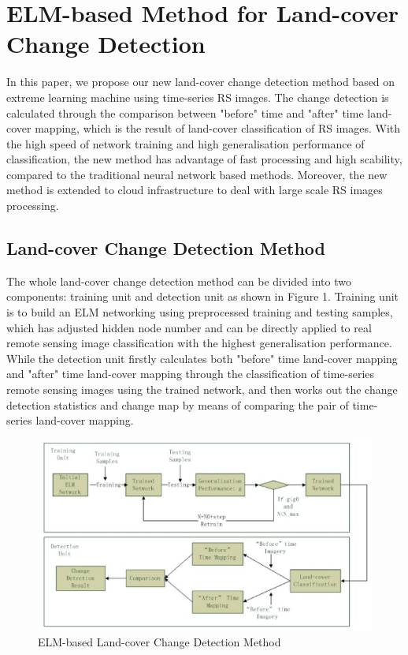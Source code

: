 \documentclass{elsart}
\begin{document}
\section{ELM-based Method for Land-cover Change Detection}
In this paper, we propose our new land-cover change detection method based on extreme learning machine using time-series RS images.
The change detection is calculated through the comparison between "before" time and "after" time land-cover mapping, which is the result of land-cover classification of RS images.
With the high speed of network training and high generalisation performance of classification, the new method has advantage of fast processing and high scability, compared to the traditional neural network based methods.
Moreover, the new method is extended to cloud infrastructure to deal with large scale RS images processing.

\subsection{Land-cover Change Detection Method}
The whole land-cover change detection method can be divided into two components: training unit and detection unit as shown in Figure 1.
Training unit is to build an ELM networking using preprocessed training and testing samples, which has adjusted hidden node number and can be directly applied to real remote sensing image classification with the highest generalisation performance.
While the detection unit firstly calculates both "before" time land-cover mapping and "after" time land-cover mapping through the classification of time-series remote sensing images using the trained network, and then works out the change detection statistics and change map by means of comparing the pair of time-series land-cover mapping.
\begin{figure}[tbh]
\begin{center}
\includegraphics[width=15cm]{method.eps}
\caption{ELM-based Land-cover Change Detection Method}
\label{method}
\end{center}
\end{figure}
\par
\end{document}
